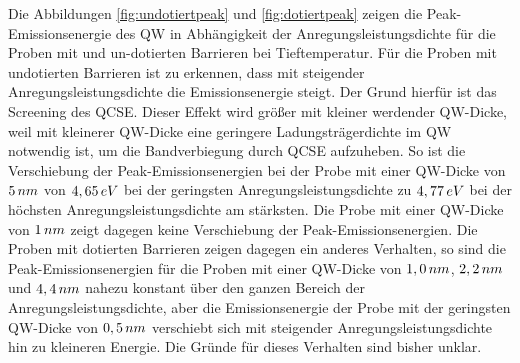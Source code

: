 \noindent 
Die Abbildungen \ref{fig:undotiertpeak} und \ref{fig:dotiertpeak} zeigen die Peak-Emissionsenergie des QW in Abhängigkeit der Anregungsleistungsdichte für die Proben mit und un-dotierten Barrieren bei Tieftemperatur. 
\newline
Für die Proben mit undotierten Barrieren ist zu erkennen, dass mit steigender Anregungsleistungsdichte die Emissionsenergie steigt. Der Grund hierfür ist das Screening des QCSE. Dieser Effekt wird größer mit kleiner werdender QW-Dicke, weil mit kleinerer QW-Dicke eine geringere Ladungsträgerdichte im QW notwendig ist, um die Bandverbiegung durch QCSE aufzuheben. 
\newline
So ist die Verschiebung der Peak-Emissionsenergien bei der Probe mit einer QW-Dicke von $5 \thinspace nm$ von $4,65 \thinspace eV$ bei der geringsten Anregungsleistungsdichte zu $4,77 \thinspace eV$ bei der höchsten Anregungsleistungsdichte am stärksten. Die Probe mit einer QW-Dicke von $1 \thinspace nm$ zeigt dagegen keine Verschiebung der Peak-Emissionsenergien. 
\newline
Die Proben mit dotierten Barrieren zeigen dagegen ein anderes Verhalten, so sind die Peak-Emissionsenergien für die Proben mit einer QW-Dicke von 
$1,0 \thinspace nm$, $2,2 \thinspace nm$ und $4,4 \thinspace nm$ nahezu konstant über den ganzen Bereich der Anregungsleistungsdichte, aber die Emissionsenergie der Probe mit der geringsten QW-Dicke von $0,5 \thinspace nm$ verschiebt sich mit steigender Anregungsleistungsdichte hin zu kleineren Energie. Die Gründe für dieses Verhalten sind bisher unklar.
